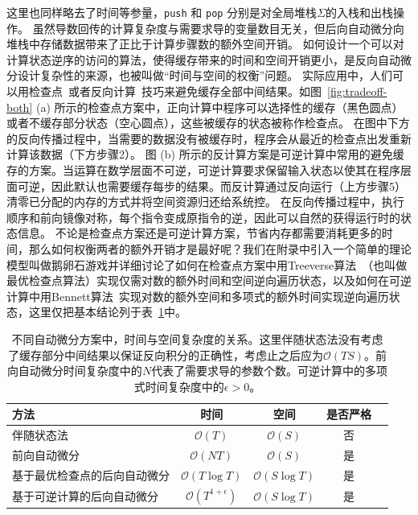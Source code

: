 \documentclass[A4,twoside,UTF8]{ctexart}
\newcommand{\bigO}{{\mathcal{O}}}
\begin{document}
这里也同样略去了时间等参量，\texttt{push} 和 \texttt{pop} 分别是对全局堆栈$\Sigma$的入栈和出栈操作。
虽然导数回传的计算复杂度与需要求导的变量数目无关，但后向自动微分向堆栈中存储数据带来了正比于计算步骤数的额外空间开销。
如何设计一个可以对计算状态逆序的访问的算法，使得缓存带来的时间和空间开销更小，是反向自动微分设计复杂性的来源，也被叫做“时间与空间的权衡”问题。
实际应用中，人们可以用检查点~\cite{Griewank1992}或者反向计算~\cite{Liu2020b}技巧来避免缓存全部中间结果。如图~\ref{fig:tradeoff-both} (a) 所示的检查点方案中，正向计算中程序可以选择性的缓存（黑色圆点）或者不缓存部分状态（空心圆点），这些被缓存的状态被称作检查点。
在图中下方的反向传播过程中，当需要的数据没有被缓存时，程序会从最近的检查点出发重新计算该数据（下方步骤2）。
图 (b) 所示的反计算方案是可逆计算中常用的避免缓存的方案。当运算在数学层面不可逆，可逆计算要求保留输入状态以使其在程序层面可逆，因此默认也需要缓存每步的结果。而反计算通过反向运行（上方步骤5）清零已分配的内存的方式并将空间资源归还给系统控。
在反向传播过程中，执行顺序和前向镜像对称，每个指令变成原指令的逆，因此可以自然的获得运行时的状态信息。
不论是检查点方案还是可逆计算方案，节省内存都需要消耗更多的时间，那么如何权衡两者的额外开销才是最好呢？我们在附录中引入一个简单的理论模型叫做鹅卵石游戏并详细讨论了如何在检查点方案中用Treeverse算法~\cite{Griewank1992}（也叫做最优检查点算法）实现仅需对数的额外时间和空间逆向遍历状态，以及如何在可逆计算中用Bennett算法~\cite{Levine1990}实现对数的额外空间和多项式的额外时间实现逆向遍历状态，这里仅把基本结论列于表~\ref{tbl:complexity}中。

\begin{table}\centering
    \begin{tabularx}{0.8\textwidth}{Xcccc}\toprule
        \textbf{方法} & 时间 & 空间 & 是否严格 \\
        \hline
        伴随状态法                    &  $\bigO(T)$          & $\bigO(S)$ & 否 \\
        前向自动微分                 &  $\bigO(NT)$         & $\bigO(S)$ & 是 \\
        基于最优检查点的后向自动微分     &  $\bigO(T\log T)$    & $\bigO(S\log T)$  & 是\\
        基于可逆计算的后向自动微分   &  $\bigO(T^{1+\epsilon})$ & $\bigO(S\log T)$  & 是 \\
        \bottomrule
    \end{tabularx}
    \caption{不同自动微分方案中，时间与空间复杂度的关系。这里伴随状态法没有考虑了缓存部分中间结果以保证反向积分的正确性，考虑止之后应为$\bigO(TS)$。前向自动微分时间复杂度中的$N$代表了需要求导的参数个数。可逆计算中的多项式时间复杂度中的$\epsilon > 0$。} \label{tbl:complexity}
\end{table}
\end{document}
